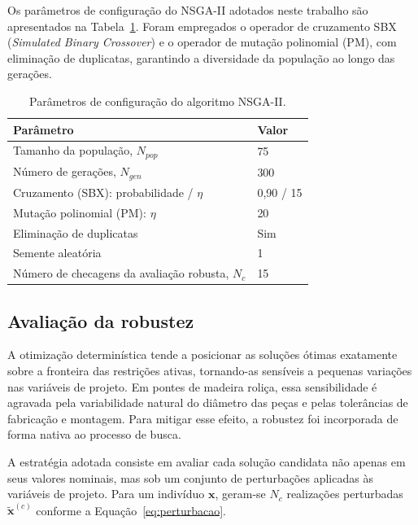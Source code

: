 Os parâmetros de configuração do NSGA-II adotados neste trabalho são apresentados na Tabela~\ref{tab:nsga2}. Foram empregados o operador de cruzamento SBX (\textit{Simulated Binary Crossover}) e o operador de mutação polinomial (PM), com eliminação de duplicatas, garantindo a diversidade da população ao longo das gerações.

\begin{table}[!ht]
\caption{Parâmetros de configuração do algoritmo NSGA-II.\label{tab:nsga2}}
\begin{threeparttable}
\begin{tabular*}{\columnwidth}{@{\extracolsep\fill}ll@{\extracolsep\fill}}
\toprule
Parâmetro & Valor \\
\midrule
Tamanho da população, $N_{pop}$ & 75 \\
Número de gerações, $N_{gen}$ & 300 \\
Cruzamento (SBX): probabilidade / $\eta$ & 0{,}90 / 15 \\
Mutação polinomial (PM): $\eta$ & 20 \\
Eliminação de duplicatas & Sim \\
Semente aleatória & 1 \\
Número de checagens da avaliação robusta, $N_c$ & 15 \\
\bottomrule
\end{tabular*}
\end{threeparttable}
\end{table}

\subsection{Avaliação da robustez}\label{sec:robustez}

A otimização determinística tende a posicionar as soluções ótimas exatamente sobre a fronteira das restrições ativas, tornando-as sensíveis a pequenas variações nas variáveis de projeto. Em pontes de madeira roliça, essa sensibilidade é agravada pela variabilidade natural do diâmetro das peças e pelas tolerâncias de fabricação e montagem. Para mitigar esse efeito, a robustez foi incorporada de forma nativa ao processo de busca.

A estratégia adotada consiste em avaliar cada solução candidata não apenas em seus valores nominais, mas sob um conjunto de perturbações aplicadas às variáveis de projeto. Para um indivíduo $\mathbf{x}$, geram-se $N_c$ realizações perturbadas $\tilde{\mathbf{x}}^{(c)}$ conforme a Equação~\eqref{eq:perturbacao}.

